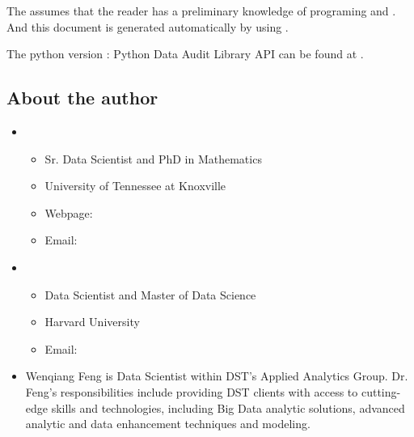 \documentclass[letterpaper,12pt,english]{sphinxmanual}
\begin{document}
The  assumes that the reader has a preliminary knowledge of  programing and . And this document is generated automatically by using .

The python version : Python Data Audit Library API can be found at .


\subsection{About the author}
\label{\detokenize{preface:about-the-author}}\begin{itemize}
\item {} 
\begin{itemize}
\item {} 
Sr. Data Scientist and PhD in Mathematics

\item {} 
University of Tennessee at Knoxville

\item {} 
Webpage: 

\item {} 
Email: 

\end{itemize}

\item {} 
\begin{itemize}
\item {} 
Data Scientist and Master of Data Science

\item {} 
Harvard University

\item {} 
Email:  

\end{itemize}

\item {} 

Wenqiang Feng is Data Scientist within DST’s Applied Analytics Group. Dr. Feng’s responsibilities include providing DST clients with access to cutting-edge skills and technologies, including Big Data analytic solutions, advanced analytic and data enhancement techniques and modeling.


\end{itemize}
\end{document}
